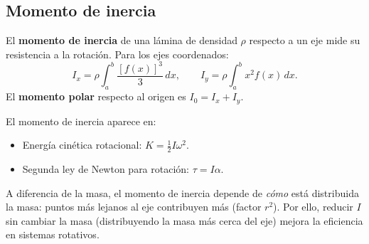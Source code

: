 

\subsection{Momento de inercia}

\begin{definition}
El \textbf{momento de inercia} de una lámina de densidad $\rho$ respecto
a un eje mide su resistencia a la rotación. Para los ejes coordenados:
\[
  I_x = \rho\int_a^b\frac{[f(x)]^3}{3}\,dx, \qquad
  I_y = \rho\int_a^b x^2 f(x)\,dx.
\]
El \textbf{momento polar} respecto al origen es $I_0=I_x+I_y$.
\end{definition}

\begin{rem}
El momento de inercia aparece en:
\begin{itemize}
  \item Energía cinética rotacional: $K=\frac{1}{2}I\omega^2$.
  \item Segunda ley de Newton para rotación: $\tau=I\alpha$.
\end{itemize}
A diferencia de la masa, el momento de inercia depende de \emph{cómo} está
distribuida la masa: puntos más lejanos al eje contribuyen más (factor
$r^2$). Por ello, reducir $I$ sin cambiar la masa (distribuyendo la masa
más cerca del eje) mejora la eficiencia en sistemas rotativos.
\end{rem}


